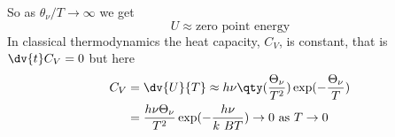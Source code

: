 So as $\theta_{\nu}/T \to \infty$ we get
\begin{equation}
  \label{eq:4}
  U \approx \text{zero point energy}
\end{equation}
In classical thermodynamics the heat capacity, $C_{V}$, is constant,
that is $\dv{t} C_V = 0$ but here
\begin{align*}
  C_V &= \dv{U}{T} \approx h \nu \qty( \frac{\Theta_{\nu}}{T^2}) \exp(- \frac{\Theta_{\nu}}{T}) \\
&= \frac{h \nu \Theta_{\nu}}{T^2} \exp(- \frac{h \nu}{k~B T}) \to 0 \ \text{as} \ T \to 0
\end{align*}


